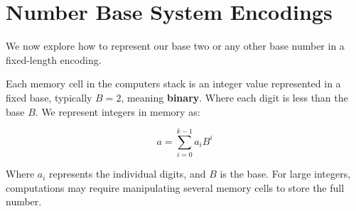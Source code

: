 \vspace{-2em}
\section{Number Base System Encodings}
 
\noindent
We now explore how to represent our base two or any other base number in a fixed-length encoding.


    

\begin{Def}

    \label{def:number_base_fixed_length_encoding}

    \noindent
    Each memory cell in the computers stack is an integer value represented in a fixed base, typically \(B = 2\), 
    meaning \textbf{binary}. Where each digit is less than the base \(B\). We represent integers in memory as:

    \[
    a = \sum_{i=0}^{k-1} a_i B^i
    \]
    
    \noindent
    Where \( a_i \) represents the individual digits, and \(B\) is the base. For large integers, computations may require manipulating several memory cells to store the full number.
\end{Def}

